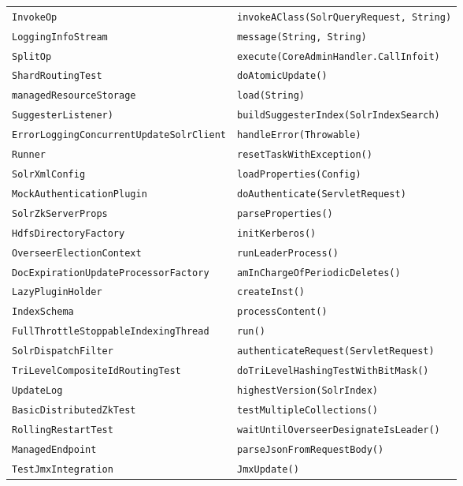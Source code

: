 \begin{center}
\begin{longtable}{ll}
\lstinline/InvokeOp/&{\lstinline/invokeAClass(SolrQueryRequest, String)/}\\
\lstinline/LoggingInfoStream/&{\lstinline/message(String, String)/}\\
\lstinline/SplitOp/&{\lstinline/execute(CoreAdminHandler.CallInfoit)/}\\
\lstinline/ShardRoutingTest/&{\lstinline/doAtomicUpdate()/}\\
\lstinline/managedResourceStorage/&{\lstinline/load(String)/}\\
\lstinline/SuggesterListener)/&{\lstinline/buildSuggesterIndex(SolrIndexSearch)/}\\
\lstinline/ErrorLoggingConcurrentUpdateSolrClient/&{\lstinline/handleError(Throwable)/}\\
\lstinline/Runner/&{\lstinline/resetTaskWithException()/}\\
\lstinline/SolrXmlConfig/&{\lstinline/loadProperties(Config)/}\\
\lstinline/MockAuthenticationPlugin/&{\lstinline/doAuthenticate(ServletRequest)/}\\
\lstinline/SolrZkServerProps/&{\lstinline/parseProperties()/}\\
\lstinline/HdfsDirectoryFactory/&{\lstinline/initKerberos()/}\\
\lstinline/OverseerElectionContext/&{\lstinline/runLeaderProcess()/}\\
\lstinline/DocExpirationUpdateProcessorFactory/&{\lstinline/amInChargeOfPeriodicDeletes()/}\\
\lstinline/LazyPluginHolder/&{\lstinline/createInst()/}\\
\lstinline/IndexSchema/&{\lstinline/processContent()/}\\
\lstinline/FullThrottleStoppableIndexingThread/&{\lstinline/run()/}\\
\lstinline/SolrDispatchFilter/&{\lstinline/authenticateRequest(ServletRequest)/}\\
\lstinline/TriLevelCompositeIdRoutingTest/&{\lstinline/doTriLevelHashingTestWithBitMask()/}\\
\lstinline/UpdateLog/&{\lstinline/highestVersion(SolrIndex)/}\\
\lstinline/BasicDistributedZkTest/&{\lstinline/testMultipleCollections()/}\\
\lstinline/RollingRestartTest/&{\lstinline/waitUntilOverseerDesignateIsLeader()/}\\
\lstinline/ManagedEndpoint/&{\lstinline/parseJsonFromRequestBody()/}\\
\lstinline/TestJmxIntegration/&{\lstinline/JmxUpdate()/}\\

\end{longtable}
\end{center}
